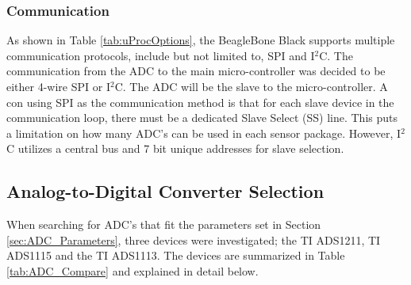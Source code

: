\subsubsection{Communication}
\label{sec:adc_comm}
\indent As shown in Table \ref{tab:uProcOptions}, the BeagleBone Black supports multiple communication protocols, include but not limited to, SPI and
I$^{2}$C. The communication from the ADC to the main micro-controller was decided to be either  4-wire SPI or I$^{2}$C. The ADC will be the slave to the
micro-controller. A con using SPI as the communication method is that for each slave device in the communication loop, there must be a dedicated Slave
Select (SS) line. This puts a limitation on how many ADC's can be used in each sensor package. However, I$^{2}$C utilizes a central bus and 7 bit unique
addresses for slave selection.

\subsection{Analog-to-Digital Converter Selection}
\indent When searching for ADC's that fit the parameters set in Section \ref{sec:ADC_Parameters}, three devices were investigated; the TI ADS1211, TI
ADS1115 and the TI ADS1113. The devices are summarized in Table \ref{tab:ADC_Compare} and explained in detail below.

